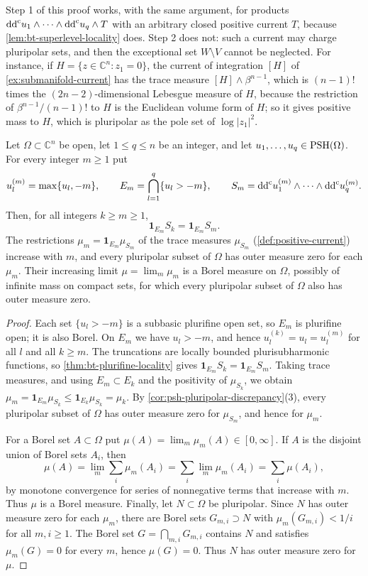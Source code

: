 Step 1 of this proof works, with the same argument, for products $\mathrm{dd}^{\mathrm{c}} u_1\wedge\cdots\wedge\mathrm{dd}^{\mathrm{c}} u_q\wedge T$ with an arbitrary closed positive current $T$, because \cref{lem:bt-superlevel-locality} does. Step 2 does not: such a current may charge pluripolar sets, and then the exceptional set $W\setminus V$ cannot be neglected. For instance, if $H=\{z\in\mathbb C^n:z_1=0\}$, the current of integration $[H]$ of \cref{ex:submanifold-current} has the trace measure $[H]\wedge\beta^{n-1}$, which is $(n-1)!$ times the $(2n-2)$-dimensional Lebesgue measure of $H$, because the restriction of $\beta^{n-1}/(n-1)!$ to $H$ is the Euclidean volume form of $H$; so it gives positive mass to $H$, which is pluripolar as the pole set of $\log|z_1|^2$.

\begin{proposition}\label{prop:finite-locus-truncation}
Let $\Omega\subset\mathbb C^n$ be open, let $1\le q\le n$ be an integer, and let $u_1,\ldots,u_q\in\mathrm{PSH}(\Omega)$. For every integer $m\ge1$ put
\[
 u_l^{(m)}=\max\{u_l,-m\},\qquad E_m=\bigcap_{l=1}^q\{u_l>-m\},\qquad S_m=\mathrm{dd}^{\mathrm{c}} u_1^{(m)}\wedge\cdots\wedge\mathrm{dd}^{\mathrm{c}} u_q^{(m)}.
\]
Then, for all integers $k\ge m\ge1$,
\[
 \mathbf1_{E_m}S_k=\mathbf1_{E_m}S_m.
\]
The restrictions $\mu_m=\mathbf1_{E_m}\mu_{S_m}$ of the trace measures $\mu_{S_m}$ (\cref{def:positive-current}) increase with $m$, and every pluripolar subset of $\Omega$ has outer measure zero for each $\mu_m$. Their increasing limit $\mu=\lim_m\mu_m$ is a Borel measure on $\Omega$, possibly of infinite mass on compact sets, for which every pluripolar subset of $\Omega$ also has outer measure zero.
\end{proposition}
\begin{proof}
Each set $\{u_l>-m\}$ is a subbasic plurifine open set, so $E_m$ is plurifine open; it is also Borel. On $E_m$ we have $u_l>-m$, and hence $u_l^{(k)}=u_l=u_l^{(m)}$ for all $l$ and all $k\ge m$. The truncations are locally bounded plurisubharmonic functions, so \cref{thm:bt-plurifine-locality} gives $\mathbf1_{E_m}S_k=\mathbf1_{E_m}S_m$. Taking trace measures, and using $E_m\subset E_k$ and the positivity of $\mu_{S_k}$, we obtain $\mu_m=\mathbf1_{E_m}\mu_{S_k}\le\mathbf1_{E_k}\mu_{S_k}=\mu_k$. By \cref{cor:psh-pluripolar-discrepancy}(3), every pluripolar subset of $\Omega$ has outer measure zero for $\mu_{S_m}$, and hence for $\mu_m$.

For a Borel set $A\subset\Omega$ put $\mu(A)=\lim_m\mu_m(A)\in[0,\infty]$. If $A$ is the disjoint union of Borel sets $A_i$, then
\[
 \mu(A)=\lim_m\sum_i\mu_m(A_i)=\sum_i\lim_m\mu_m(A_i)=\sum_i\mu(A_i),
\]
by monotone convergence for series of nonnegative terms that increase with $m$. Thus $\mu$ is a Borel measure. Finally, let $N\subset\Omega$ be pluripolar. Since $N$ has outer measure zero for each $\mu_m$, there are Borel sets $G_{m,i}\supset N$ with $\mu_m(G_{m,i})<1/i$ for all $m,i\ge1$. The Borel set $G=\bigcap_{m,i}G_{m,i}$ contains $N$ and satisfies $\mu_m(G)=0$ for every $m$, hence $\mu(G)=0$. Thus $N$ has outer measure zero for $\mu$.
\end{proof}


